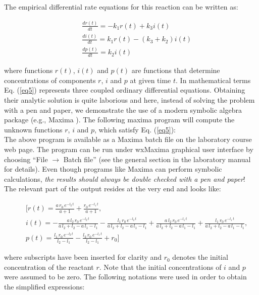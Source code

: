 \documentclass[byrevtex,amssymb,aps,pra,floatfix,letterpaper]{revtex4}
\begin{document}
\noindent
The empirical differential rate equations for this reaction can be written as:

\begin{eqnarray}
\label{eq5}
& & \frac{dr(t)}{dt} = -k_1r(t) + k_3i(t)\\
\nonumber
& & \frac{di(t)}{dt} = k_1r(t) - (k_3 + k_2)i(t)\\
\nonumber
& & \frac{dp(t)}{dt} = k_2i(t)
\end{eqnarray}

\noindent
where functions $r(t)$, $i(t)$ and $p(t)$ are functions that determine concentrations of components $r$, $i$ and $p$ at given time $t$. In mathematical terms Eq. (\ref{eq5}) represents three coupled ordinary differential equations. Obtaining their analytic solution is quite laborious and here, instead of solving the problem with a pen and paper, we demonstrate the use of a modern symbolic algebra package (e.g., Maxima \cite{MAXIMA}). The following maxima program will compute the unknown functions $r$, $i$ and $p$, which satisfy Eq. (\ref{eq5}):\\



\noindent
The above program is available as a Maxima batch file on the laboratory course web page. The program can be run under wxMaxima graphical user interface by choosing ``File $\rightarrow$ Batch file'' (see the general section in the laboratory manual for details). Even though programs like Maxima can perform symbolic calculations, \textit{the results should always be double checked with a pen and paper}! The relevant part of the output resides at the very end and looks like:

\begin{eqnarray}
\label{eq6}
& & [r\left( t\right) =\frac{a\,r_0\,{e}^{-l_2\,t}}{a+1}+\frac{r_0\,{e}^{-l_1\,t}}{a+1},\\
\label{eq7}
& & i\left( t\right) =-\frac{a\,l_2\,r_0\,{e}^{-l_2\,t}}{a\,l_2+l_2-a\,l_1-l_1}-\frac{l_1\,r_0\,{e}^{-l_2\,t}}{a\,l_2+l_2-a\,l_1-l_1}+\frac{a\,l_2\,r_0\,{e}^{-l_1\,t}}{a\,l_2+l_2-a\,l_1-l_1}+\frac{l_1\,r_0\,{e}^{-l_1\,t}}{a\,l_2+l_2-a\,l_1-l_1},\\
\label{eq8}
& & p\left( t\right) =\frac{l_1\,r_0\,{e}^{-l_2\,t}}{l_2-l_1}-\frac{l_2\,r_0\,{e}^{-l_1\,t}}{l_2-l_1}+r_0]
\end{eqnarray}

\noindent
where subscripts have been inserted for clarity and $r_0$ denotes the initial concentration of the reactant $r$. Note that the initial concentrations of $i$ and $p$ were assumed to be zero. The following notations were used in order to obtain the simplified expressions:
\end{document}
